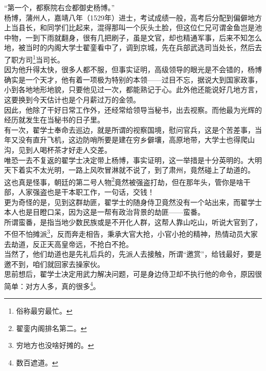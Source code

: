 \begin{multicols}{\theparacolNo}
“第一个，都察院右佥都御史杨博。”\\

杨博，蒲州人，嘉靖八年（1529年）进士，考试成绩一般，高考后分配到偏僻地方上当县长，和同学们比起来，混得那叫一个灰头土脸，但这位仁兄可谓金鱼岂是池中物，一到下雨就翻身，很有几把刷子，虽是文官，却也精通军事，后来不知怎么地，被当时的内阁大学士翟銮看中了，调到京城，先在兵部武选司当处长，然后去了职方司\footnote{俗称最穷最忙。}当司长。\\

因为他升得太快，很多人都不服，但事实证明，高级领导的眼光是不会错的，杨博确实是一个天才，他有着一项极为特别的本领——过目不忘，据说大到国家政事，小到各地地形地貌，只要他见过一次，都能熟记于心。此外他还能说好几地方言，这要换到今天估计也是个月薪过万的金领。\\

因此，他除了干好日常工作外，还经常给领导当秘书，出去视察。而他最为光辉的经历就发生在当秘书的日子里。\\

有一次，翟学士奉命去巡边，就是所谓的视察国境，慰问官兵，这是个苦差事，当年又没有直升飞机，这边防哨所要是建在穷乡僻壤，高原地带，大学士也得爬山沟，见到人喝杯茶才好走人交差。\\

唯恐一去不复返的翟学士决定带上杨博，事实证明，这一举措是十分英明的。大明天下着实不太光明，一路上风吹冒淋就不说了，到了肃州，竟然碰上了劫道的。\\

这也真是怪事，朝廷的第二号人物\footnote{翟銮内阁排名第二。}竟然被强盗打劫，但在那年头，管你是啥干部，人家强盗也是干本职工作，一句话，交钱！\\

更为奇怪的是，见到这群劫匪，翟学士的随身侍卫竟然没有一个站出来，而翟学士本人也是目瞪口呆，因为这是一帮有政治背景的劫匪——蛮番。\\

所谓蛮番，是指当地少数民族或是不开化人群，这帮人靠山吃山，听说大官到了，不但不怕摊派\footnote{穷地方也没啥好摊的。}，反而奔走相告，秉承大官大抢，小官小抢的精神，热情动员大家去劫道，反正天高皇帝远，不抢白不抢。\\

当然了，他们劫道也是先礼后兵的，先派人去接触，所谓“邀赏”，给钱最好，要是邀不到，咱们就回家去操家伙。\\

思前想后，翟学士决定用武力解决问题，可是身边侍卫却不执行他的命令，原因很简单：对方人多，真的很多\footnote{数百遮道。}。\\


\end{multicols}
